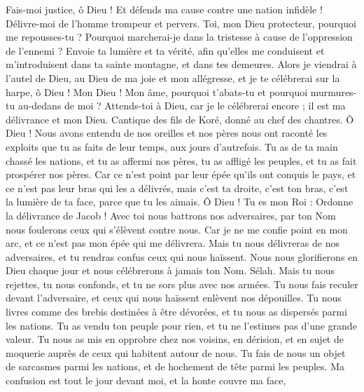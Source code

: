 \begin{multicols}{2}
\VerseOne{}Fais-moi justice, ô Dieu ! Et défends ma cause contre une nation infidèle ! Délivre-moi de l'homme trompeur et pervers.
Toi, mon Dieu protecteur, pourquoi me repousses-tu ? Pourquoi marcherai-je dans la tristesse à cause de l'oppression de l'ennemi ?
Envoie ta lumière et ta vérité, afin qu'elles me conduisent et m'introduisent dans ta sainte montagne, et dans tes demeures.
Alors je viendrai à l'autel de Dieu, au Dieu de ma joie et mon allégresse, et je te célébrerai sur la harpe, ô Dieu ! Mon Dieu !
Mon âme, pourquoi t'abats-tu et pourquoi murmures-tu au-dedans de moi ? Attends-toi à Dieu, car je le célébrerai encore ; il est ma délivrance et mon Dieu.
\VerseOne{}Cantique des fils de Koré, donné au chef des chantres.
Ô Dieu ! Nous avons entendu de nos oreilles et nos pères nous ont raconté les exploits que tu as faits de leur temps, aux jours d'autrefois.
Tu as de ta main chassé les nations, et tu as affermi nos pères, tu as affligé les peuples, et tu as fait prospérer nos pères.
Car ce n'est point par leur épée qu'ils ont conquis le pays, et ce n'est pas leur bras qui les a délivrés, mais c'est ta droite, c'est ton bras, c'est la lumière de ta face, parce que tu les aimais.
Ô Dieu ! Tu es mon Roi : Ordonne la délivrance de Jacob !
Avec toi nous battrons nos adversaires, par ton Nom nous foulerons ceux qui s'élèvent contre nous.
Car je ne me confie point en mon arc, et ce n'est pas mon épée qui me délivrera.
Mais tu nous délivreras de nos adversaires, et tu rendras confus ceux qui nous haïssent.
Nous nous glorifierons en Dieu chaque jour et nous célébrerons à jamais ton Nom. Sélah.
Mais tu nous rejettes, tu nous confonds, et tu ne sors plus avec nos armées.
Tu nous fais reculer devant l'adversaire, et ceux qui nous haïssent enlèvent nos dépouilles.
Tu nous livres comme des brebis destinées à être dévorées, et tu nous as dispersés parmi les nations.
Tu as vendu ton peuple pour rien, et tu ne l'estimes pas d'une grande valeur.
Tu nous as mis en opprobre chez nos voisins, en dérision, et en sujet de moquerie auprès de ceux qui habitent autour de nous.
Tu fais de nous un objet de sarcasmes parmi les nations, et de hochement de tête parmi les peuples.
Ma confusion est tout le jour devant moi, et la honte couvre ma face,

\end{multicols}

